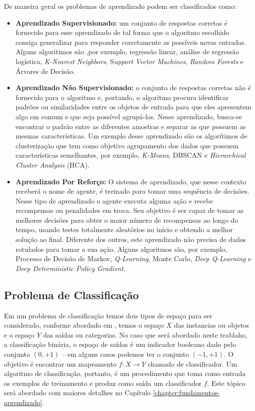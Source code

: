De maneira geral os problemas de aprendizado podem ser classificados como:
\begin{itemize}
  \item \textbf{Aprendizado Supervisionado:} um conjunto de respostas corretas é fornecido para esse aprendizado de tal forma que o algoritmo escolhido consiga generalizar para responder corretamente as possíveis novas entradas. Alguns algoritimos são ,por exemplo, regressão linear, análise de regressão logística, \textit{K-Nearest Neighbors}, S\textit{upport Vector Machines}, \textit{Random Forests} e Árvores de Decisão.
  \item \textbf{Aprendizado Não Supervisionado:} o conjunto de respostas corretas não é fornecido para o algoritmo e, portando, o algoritmo procura identificar padrões ou similaridades entre os objetos de entrada para que eles apresentem algo em comum e que seja possível agrupá-los. Nesse aprendizado, busca-se encontrar o padrão entre as diferentes amostras e separar as que possuem as mesmas características. Um exemplo desse aprendizado são os algorítimos de clusterização que tem como objetivo agrupamento dos dados que possuem características semelhantes, por exemplo, \textit{K-Means}, DBSCAN e \textit{Hierarchical Cluster Analysis} (HCA). 
  \item \textbf{Aprendizado Por Reforço:} O sistema de aprendizado, que nesse contexto receberá o nome de agente, é treinado para tomar uma sequência de decisões. Nesse tipo de aprendizado o agente executa alguma ação e recebe recompensas ou penalidades em troca. Seu objetivo é ser capaz de tomar as melhores decisões para obter o maior número de recompensas ao longo do tempo, usando testes totalmente aleatórios no início e obtendo a melhor solução ao final. Diferente dos outros, este aprendizado não precisa de dados rotulados para tomar a sua ação. Alguns algoritmos são, por exemplo, Processo de Decisão de Markov, \textit{Q-Learning}, Monte Carlo, \textit{Deep Q-Learning} e \textit{Deep Deterministic Policy Gradient}.
\end{itemize}
\subsection{Problema de Classificação}
Em um problema de classificação temos dois tipos de espaço para ser considerado, conforme abordado em \cite{luxburg:artigo}, temos o espaço $X$ das instancias ou objetos e o espaço $Y$ das saídas ou categorias. No caso que será abordado neste trablaho, a classificação binária, o espaço de saídas é um indicador booleano dado pelo conjunto ${(0,+1)}$  -- em alguns casos podemos ter o conjunto ${(-1,+1)}$. O objetivo é encontrar um mapeamento $f:X \rightarrow Y$ chamado de classificador. Um algoritmo de classificação, portanto, é um procedimento que toma como entrada os exemplos de treinamento e produz como saída um classificador $f$. Este tópico será abordado com maiores detalhes no Capítulo \ref{chapter:fundamentos-aprendizado}.

